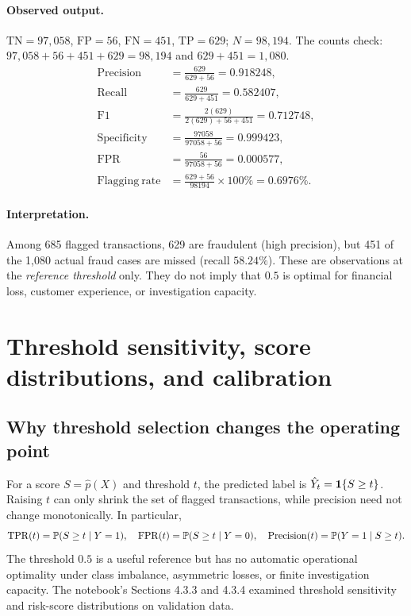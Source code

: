 \documentclass[11pt,a4paper]{article}
\begin{document}
\paragraph{Observed output.} $\mathrm{TN}=97{,}058$, $\mathrm{FP}=56$, $\mathrm{FN}=451$, $\mathrm{TP}=629$; $N=98{,}194$. The counts check: $97{,}058+56+451+629=98{,}194$ and $629+451=1{,}080$.
\begin{align*}
\mathrm{Precision}&=\frac{629}{629+56}=0.918248,\\
\mathrm{Recall}&=\frac{629}{629+451}=0.582407,\\
\mathrm{F1}&=\frac{2(629)}{2(629)+56+451}=0.712748,\\
\mathrm{Specificity}&=\frac{97058}{97058+56}=0.999423,\\
\mathrm{FPR}&=\frac{56}{97058+56}=0.000577,\\
\mathrm{Flagging\ rate}&=\frac{629+56}{98194}\times100\%=0.6976\%.
\end{align*}
\paragraph{Interpretation.} Among 685 flagged transactions, 629 are fraudulent (high precision), but 451 of the 1,080 actual fraud cases are missed (recall $58.24\%$). These are observations at the \emph{reference threshold} only. They do not imply that $0.5$ is optimal for financial loss, customer experience, or investigation capacity.


\section{Threshold sensitivity, score distributions, and calibration}
\subsection{Why threshold selection changes the operating point}
For a score $S=\hat p(X)$ and threshold $t$, the predicted label is $\hat Y_t=\mathbf 1\{S\ge t\}$. Raising $t$ can only shrink the set of flagged transactions, while precision need not change monotonically. In particular,
\begin{equation}
\operatorname{TPR}(t)=\mathbb P(S\ge t\mid Y=1),\quad
\operatorname{FPR}(t)=\mathbb P(S\ge t\mid Y=0),\quad
\operatorname{Precision}(t)=\mathbb P(Y=1\mid S\ge t).
\end{equation}
The threshold $0.5$ is a useful reference but has no automatic operational optimality under class imbalance, asymmetric losses, or finite investigation capacity. The notebook's Sections 4.3.3 and 4.3.4 examined threshold sensitivity and risk-score distributions on validation data.
\end{document}
